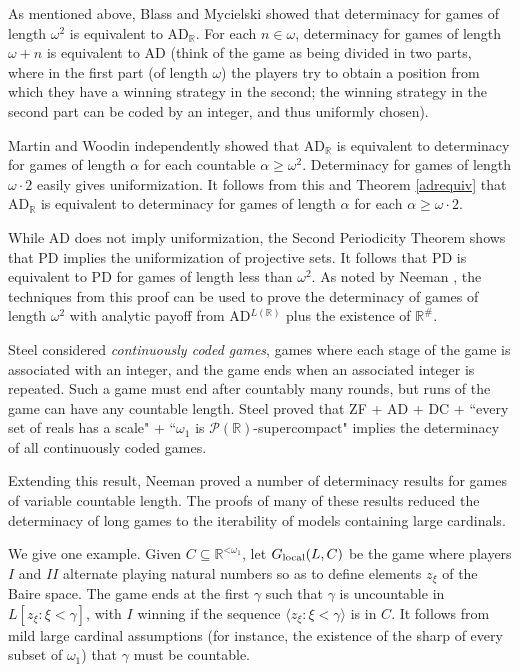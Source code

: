 \documentclass{book}%
\newcommand{\less}{\mathord{<}}
\begin{document}
As mentioned above, Blass  and Mycielski showed
that determinacy for games of length $\omega^{2}$ is equivalent to
AD$_{\mathbb{R}}$. For each $n \in \omega$, determinacy for games of
length $\omega + n$ is equivalent to AD (think of the game as being
divided in two parts, where in the first part (of length $\omega$)
the players try to obtain a position from which they have a winning
strategy in the second; the winning strategy in the second part can
be coded by an integer, and thus uniformly chosen).


Martin and Woodin independently showed that AD$_{\mathbb{R}}$ is
equivalent to determinacy for games of length $\alpha$ for each
countable $\alpha \geq \omega^{2}$. Determinacy for games of length $\omega
\cdot 2$ easily gives uniformization. It follows from this and Theorem \ref{adrequiv} that
AD$_{\mathbb{R}}$ is equivalent to determinacy for games of length
$\alpha$ for each $\alpha \geq \omega \cdot 2$.

While AD does not imply uniformization, the Second Periodicity
Theorem shows that PD implies the uniformization of projective sets.
It follows that PD is equivalent to PD for games of length less than
$\omega^{2}$. As noted by Neeman , the
techniques from this proof can be used to prove the determinacy of
games of length $\omega^{2}$ with analytic payoff from
AD$^{L(\mathbb{R})}$ plus the existence of $\mathbb{R}^{\#}$.

Steel  considered \emph{continuously coded games},
games where each stage of the game is associated with an integer,
and the game ends when an associated integer is repeated. Such a
game must end after countably many rounds, but runs of the game can
have any countable length. Steel proved that ZF + AD + DC + ``every
set of reals has a scale" + ``$\omega_{1}$ is
$\mathcal{P}(\mathbb{R})$-supercompact" implies the determinacy of
all continuously coded games.

Extending this result, Neeman 
proved a number of determinacy results for games of variable countable length. The proofs of
many of these results reduced the determinacy of long games to the iterability of models containing large cardinals.

We give one example. Given $C \subseteq \mathbb{R}^{\less\omega_{1}}$, let
$G_{\rm{local}}(L, C)$ be the game where players $I$ and $II$ alternate playing
natural numbers so as to define elements $z_{\xi}$ of the Baire space. The game ends
at the first $\gamma$ such that $\gamma$ is uncountable
in $L[z_{\xi} : \xi < \gamma]$, with $I$ winning if the sequence $\langle z_{\xi} : \xi < \gamma\rangle$ is
in $C$. It follows from mild large cardinal assumptions (for instance, the existence of the sharp of
every subset of $\omega_{1}$) that $\gamma$ must be countable.
\end{document}
